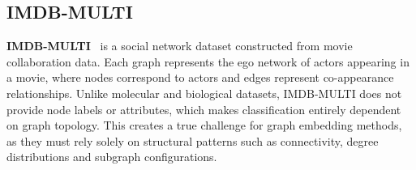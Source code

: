 \subsection{IMDB-MULTI}
\textbf{IMDB-MULTI}~\cite{yanardag2015deepgraphkernels} is a social network dataset constructed from movie collaboration data.
Each graph represents the ego network of actors appearing in a movie, where nodes correspond to actors and edges represent co-appearance relationships.
Unlike molecular and biological datasets, IMDB-MULTI does not provide node labels or attributes,
which makes classification entirely dependent on graph topology.
This creates a true challenge for graph embedding methods, as they must rely solely on structural patterns such as connectivity, degree distributions and subgraph configurations.
